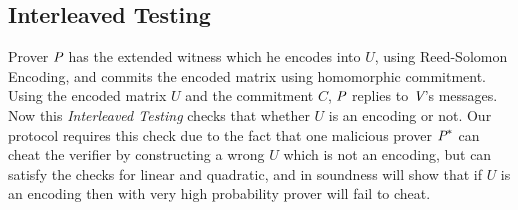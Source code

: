 \subsection{Interleaved Testing}Prover $\P$ has the extended witness which he encodes into $U$, using Reed-Solomon Encoding, and commits the encoded matrix using homomorphic commitment. Using the encoded matrix $U$ and the commitment $C$, $\P$ replies to $\V$'s messages. Now this \textit{Interleaved Testing} checks that whether $U$ is an encoding or not. Our protocol requires this check due to the fact that one malicious prover $\P^*$ can cheat the verifier by constructing a wrong $U$ which is not an encoding, but can satisfy the checks for linear and quadratic, and in soundness will show that if $U$ is an encoding then with very high probability prover will fail to cheat. 


\begin{comment}
	
\paragraph{Protocol for Testing Interleaved:}
$\P$  and $\V$ does the following:\\
\begin{itemize}
	\item $\P$ sends $c$, the Merkle root of the commitment $C$, to $\V$.
	\item $\V$ sends a $r\in_R \bbF^p$ to $\P$ .
	\item $\P$ computes $\tU=\sum\limits_{i\in[p]} r_i\cdot U[i]$, and  $ \tc = \com(\tU)$.
	\item $\P$  sends $\tc$ to $\V$.
	\item $\V$ picks $\gamma \in_R \bbF^m$ and sends to $\P$.
	\item $\P$ computes $w=\gamma^T\tU$.
	\item $\P$ sends $w$ to $\V$.
	\item $\V$ picks a random subset $Q$ of $[n]$ such that $|Q|=t$, and send $Q$ to $\P$.
	\item $\P$ sends $\tU[k]$ with the randomness $\delta_k$ used to commit $\tU[k]$ and $C[k]$ with the corresponding Merkle Paths to the root $c$, $\forall k\in Q$.
\end{itemize}
content...
\end{comment}

